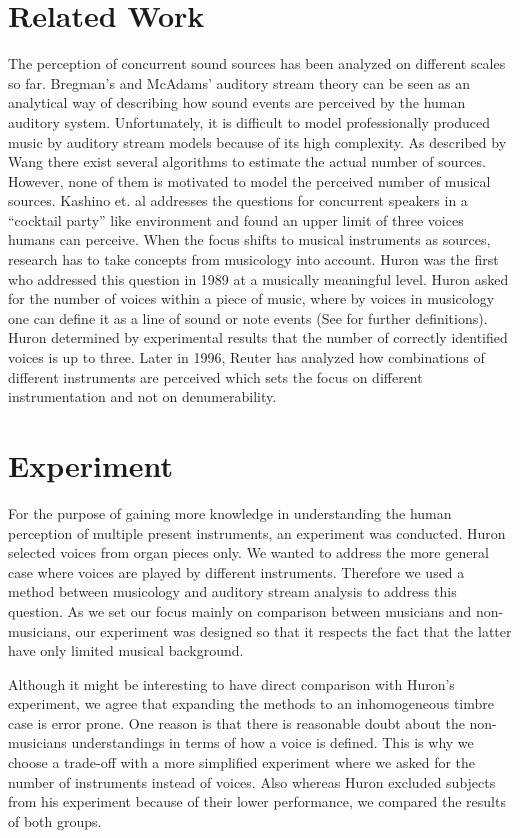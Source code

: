 \section{Related Work}
The perception of concurrent sound sources has been analyzed on different scales so far. Bregman's and McAdams' \cite{mcadams79} auditory stream theory can be seen as an analytical way of describing how sound events are perceived by the human auditory system. Unfortunately, it is difficult to model professionally produced music by auditory stream models because of its high complexity. As described by Wang \cite{wang2006} there exist several algorithms to estimate the actual number of sources. However, none of them is motivated to model the perceived number of musical sources. Kashino et. al \cite{kashino1995} addresses the questions for concurrent speakers in a ``cocktail party'' like environment and found an upper limit of three voices humans can perceive. When the focus shifts to musical instruments as sources, research has to take concepts from musicology into account. Huron \cite{huron89} was the first who addressed this question in 1989 at a musically meaningful level. Huron asked for the number of voices within a piece of music, where by voices in musicology one can define it as a line of sound or note events (See \cite{cambouropoulos2008voice} for further definitions). Huron determined by experimental results that the number of correctly identified voices is up to three. Later in 1996, Reuter \cite{reuter96} has analyzed how combinations of different instruments are perceived which sets the focus on different instrumentation and not on denumerability.
\vspace{-1.0em}
\section{Experiment}
For the purpose of gaining more knowledge in understanding the human perception of multiple present instruments, an experiment was conducted. Huron selected voices from organ pieces only. We wanted to address the more general case where voices are played by different instruments. Therefore we used a method between musicology and auditory stream analysis to address this question. As we set our focus mainly on comparison between musicians and non-musicians, our experiment was designed so that it respects the fact that the latter have only limited musical background.

Although it might be interesting to have direct comparison with Huron's experiment, we agree that expanding the methods to an inhomogeneous timbre case is error prone. One reason is that there is reasonable doubt about the non-musicians understandings in terms of how a voice is defined. This is why we choose a trade-off with a more simplified experiment where we asked for the number of instruments instead of voices. Also whereas Huron \cite{huron89}  excluded subjects from his experiment because of their lower performance, we compared the results of both groups.
\vspace{-1.0em}
